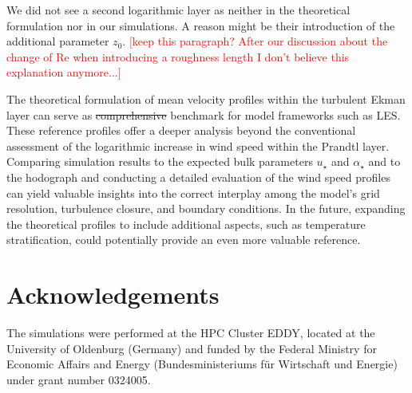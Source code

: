 \documentclass[a4paper,11pt]{article}
\newcommand{\todo}[1]{\textcolor{red}{$[$#1$]$}}
\providecommand{\DIFdel}[1]{{\protect\color{red}\sout{#1}}}                      %
\providecommand{\DIFaddbegin}{} %
\providecommand{\DIFaddend}{} %
\providecommand{\DIFdelbegin}{} %
\providecommand{\DIFdelend}{} %
\begin{document}
We did not see a second logarithmic layer as \cite{jiang2018large} neither in the theoretical formulation nor in our simulations. A reason might be their introduction of the additional parameter $z_0$. \todo{keep this paragraph? After our discussion about the change of Re when introducing a roughness length I don't believe this explanation anymore...}

The theoretical formulation of mean velocity profiles within the turbulent Ekman layer can serve as \DIFdelbegin \DIFdel{comprehensive }\DIFdelend benchmark for model frameworks such as LES. These reference profiles offer a deeper analysis beyond the conventional assessment of the logarithmic increase in wind speed within the Prandtl layer. Comparing simulation results to the expected bulk parameters $u_\star$ and $\alpha_\star$ and to the hodograph and conducting a detailed evaluation of the wind speed profiles can yield valuable insights into the correct interplay among the model's grid resolution, turbulence closure, and boundary conditions. In the future, expanding the theoretical profiles to include additional aspects, such as temperature stratification, could potentially provide an even more valuable reference.

\section{Acknowledgements}

The simulations were performed at the HPC Cluster EDDY, located at the University of Oldenburg (Germany) and funded by the Federal Ministry for Economic Affairs and Energy (Bundesministeriums für Wirtschaft und Energie) under grant number 0324005.


\DIFdelbegin %
\DIFdelend \DIFaddbegin 
\DIFaddend 
\end{document}

